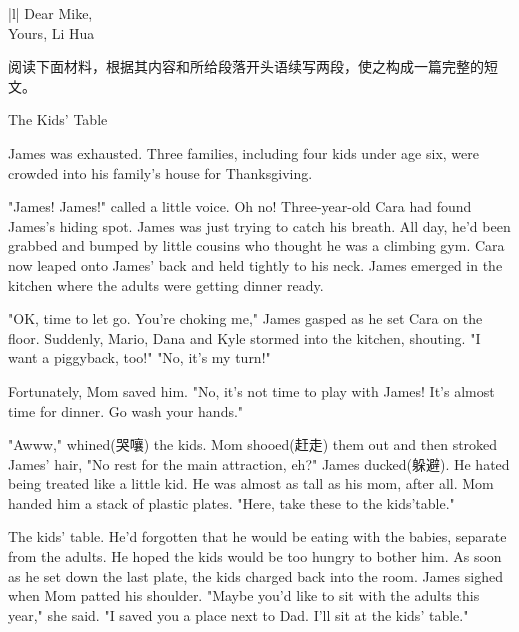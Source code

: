 \documentclass{英语试卷}
\begin{document}
\par\vspace{0.4em}
\begin{center}\begin{tabular}{{|l|}}
\hline
Dear Mike, \\
Yours, Li Hua \\
\hline
\end{tabular}\end{center}
\vspace{0.4em}
\par 阅读下面材料，根据其内容和所给段落开头语续写两段，使之构成一篇完整的短文。\par
\par The Kids' Table\par
\par James was exhausted. Three families, including four kids under age six, were crowded into his family's house for Thanksgiving.\par
\par "James! James!" called a little voice. Oh no! Three-year-old Cara had found James's hiding spot. James was just trying to catch his breath. All day, he'd been grabbed and bumped by little cousins who thought he was a climbing gym. Cara now leaped onto James' back and held tightly to his neck. James emerged in the kitchen where the adults were getting dinner ready.\par
\par "OK, time to let go. You're choking me," James gasped as he set Cara on the floor. Suddenly, Mario, Dana and Kyle stormed into the kitchen, shouting. "I want a piggyback, too!" "No, it's my turn!"\par
\par Fortunately, Mom saved him. "No, it's not time to play with James! It's almost time for dinner. Go wash your hands."\par
\par "Awww," whined(哭嚷) the kids. Mom shooed(赶走) them out and then stroked James' hair, "No rest for the main attraction, eh?" James ducked(躲避). He hated being treated like a little kid. He was almost as tall as his mom, after all. Mom handed him a stack of plastic plates. "Here, take these to the kids’table."\par
\par The kids' table. He'd forgotten that he would be eating with the babies, separate from the adults. He hoped the kids would be too hungry to bother him. As soon as he set down the last plate, the kids charged back into the room. James sighed when Mom patted his shoulder. "Maybe you'd like to sit with the adults this year," she said. "I saved you a place next to Dad. I'll sit at the kids' table."\par
\end{document}
